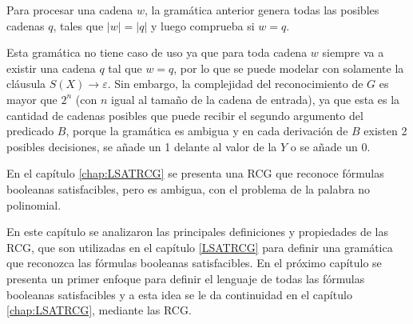 Para procesar una cadena $w$, la gramática anterior genera todas las posibles cadenas $q$, tales que $|w|=|q|$ y luego comprueba si $w = q$.

Esta gramática no tiene caso de uso ya que para toda cadena $w$ siempre va a existir una cadena $q$ tal que $w=q$, 
por lo que se puede modelar con solamente la cláusula $S(X)\to \varepsilon$. Sin embargo, la complejidad del 
reconocimiento de $G$ es mayor que $2^n$ (con $n$ igual al tamaño de la cadena de entrada), ya que esta es la 
cantidad de cadenas posibles que puede recibir el segundo argumento del predicado $B$, porque la gramática es 
ambigua y en cada derivación de $B$ existen 2 posibles decisiones, se añade un 1 delante al valor de la $Y$ o 
se añade un $0$.

En el capítulo \ref{chap:LSATRCG} se presenta una RCG que reconoce fórmulas booleanas satisfacibles, pero es ambigua, 
con el problema de la palabra no polinomial. 

En este capítulo se analizaron las principales definiciones y propiedades de las RCG, que son utilizadas en el capítulo \ref{LSATRCG} para definir una gramática que reconozca las fórmulas booleanas satisfacibles.  En el próximo capítulo se presenta un primer enfoque para definir el lenguaje de todas las fórmulas booleanas satisfacibles y a esta idea se le da continuidad en el capítulo \ref{chap:LSATRCG}, mediante las RCG.
